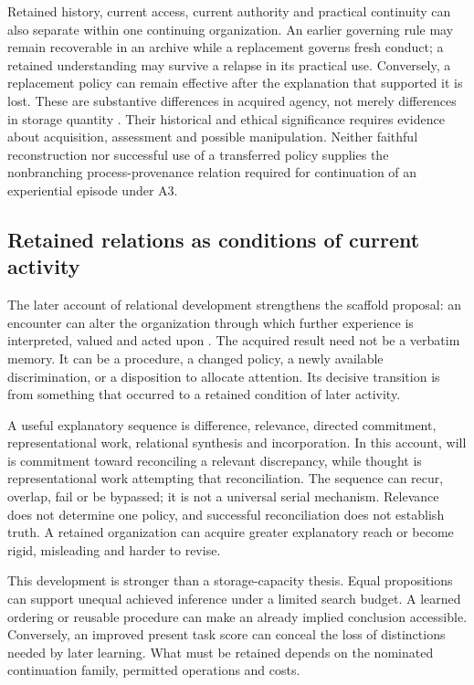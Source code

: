 Retained history, current access, current authority and practical continuity can also separate within one continuing organization. An earlier governing rule may remain recoverable in an archive while a replacement governs fresh conduct; a retained understanding may survive a relapse in its practical use. Conversely, a replacement policy can remain effective after the explanation that supported it is lost. These are substantive differences in acquired agency, not merely differences in storage quantity \cite[Sections~7, 13.4, 16.4]{RodgersConstitutedAgency}. Their historical and ethical significance requires evidence about acquisition, assessment and possible manipulation. Neither faithful reconstruction nor successful use of a transferred policy supplies the nonbranching process-provenance relation required for continuation of an experiential episode under A3.


\subsection{Retained relations as conditions of current activity}
\label{sec:update-relational-development}
The later account of relational development strengthens the scaffold proposal: an encounter can alter the organization through which further experience is interpreted, valued and acted upon \cite{RodgersDevelopment2026}. The acquired result need not be a verbatim memory. It can be a procedure, a changed policy, a newly available discrimination, or a disposition to allocate attention. Its decisive transition is from something that occurred to a retained condition of later activity.

A useful explanatory sequence is difference, relevance, directed commitment, representational work, relational synthesis and incorporation. In this account, will is commitment toward reconciling a relevant discrepancy, while thought is representational work attempting that reconciliation. The sequence can recur, overlap, fail or be bypassed; it is not a universal serial mechanism. Relevance does not determine one policy, and successful reconciliation does not establish truth. A retained organization can acquire greater explanatory reach or become rigid, misleading and harder to revise.

This development is stronger than a storage-capacity thesis. Equal propositions can support unequal achieved inference under a limited search budget. A learned ordering or reusable procedure can make an already implied conclusion accessible. Conversely, an improved present task score can conceal the loss of distinctions needed by later learning. What must be retained depends on the nominated continuation family, permitted operations and costs.

